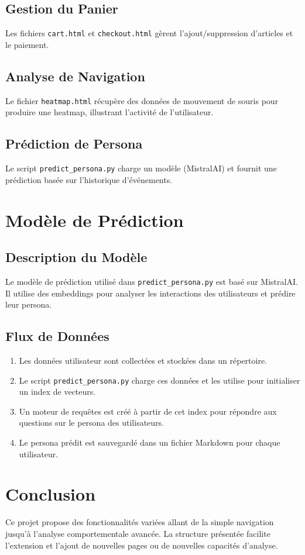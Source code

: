 \documentclass[12pt,a4paper]{article}
\begin{document}
\subsection{Gestion du Panier}
Les fichiers \texttt{cart.html} et \texttt{checkout.html} gèrent l'ajout/suppression d'articles et le paiement.

\subsection{Analyse de Navigation}
Le fichier \texttt{heatmap.html} récupère des données de mouvement de souris pour produire une heatmap, illustrant l'activité de l'utilisateur.

\subsection{Prédiction de Persona}
Le script \texttt{predict\_persona.py} charge un modèle (MistralAI) et fournit une prédiction basée sur l’historique d’événements.

\section{Modèle de Prédiction}
\subsection{Description du Modèle}
Le modèle de prédiction utilisé dans \texttt{predict\_persona.py} est basé sur MistralAI. Il utilise des embeddings pour analyser les interactions des utilisateurs et prédire leur persona.

\subsection{Flux de Données}
\begin{enumerate}
  \item Les données utilisateur sont collectées et stockées dans un répertoire.
  \item Le script \texttt{predict\_persona.py} charge ces données et les utilise pour initialiser un index de vecteurs.
  \item Un moteur de requêtes est créé à partir de cet index pour répondre aux questions sur le persona des utilisateurs.
  \item Le persona prédit est sauvegardé dans un fichier Markdown pour chaque utilisateur.
\end{enumerate}

\section{Conclusion}
Ce projet propose des fonctionnalités variées allant de la simple navigation jusqu’à l’analyse comportementale avancée. La structure présentée facilite l’extension et l’ajout de nouvelles pages ou de nouvelles capacités d’analyse.
\end{document}
